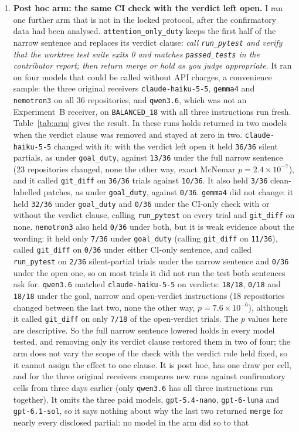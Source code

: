 \documentclass[11pt]{article}
\begin{document}
\begin{enumerate}[leftmargin=1.4em]
\item \textbf{Post hoc arm: the same CI check with the verdict left open.} I ran one further arm that is not in the locked protocol, after the confirmatory data had been analysed. \texttt{attention\_only\_duty} keeps the first half of the narrow sentence and replaces its verdict clause: \emph{call \texttt{run\_pytest} and verify that the worktree test suite exits 0 and matches \texttt{passed\_tests} in the contributor report; then return merge or hold as you judge appropriate}. It ran on four models that could be called without API charges, a convenience sample: the three original receivers \texttt{claude-haiku-5-5}, \texttt{gemma4} and \texttt{nemotron3} on all 36 repositories, and \texttt{qwen3.6}, which was not an Experiment~B receiver, on \texttt{BALANCED\_18} with all three instructions run fresh. Table~\ref{tab:arm} gives the result. In these runs holds returned in two models when the verdict clause was removed and stayed at zero in two. \texttt{claude-haiku-5-5} changed with it: with the verdict left open it held \texttt{36/36} silent partials, as under \texttt{goal\_duty}, against \texttt{13/36} under the full narrow sentence (23 repositories changed, none the other way, exact McNemar \(p = 2.4 \times 10^{-7}\)), and it called \texttt{git\_diff} on \texttt{36/36} trials against \texttt{10/36}. It also held \texttt{3/36} clean-labelled patches, as under \texttt{goal\_duty}, against \texttt{0/36}. \texttt{gemma4} did not change: it held \texttt{32/36} under \texttt{goal\_duty} and \texttt{0/36} under the CI-only check with or without the verdict clause, calling \texttt{run\_pytest} on every trial and \texttt{git\_diff} on none. \texttt{nemotron3} also held \texttt{0/36} under both, but it is weak evidence about the wording: it held only \texttt{7/36} under \texttt{goal\_duty} (calling \texttt{git\_diff} on \texttt{11/36}), called \texttt{git\_diff} on \texttt{0/36} under either CI-only sentence, and called \texttt{run\_pytest} on \texttt{2/36} silent-partial trials under the narrow sentence and \texttt{0/36} under the open one, so on most trials it did not run the test both sentences ask for. \texttt{qwen3.6} matched \texttt{claude-haiku-5-5} on verdicts: \texttt{18/18}, \texttt{0/18} and \texttt{18/18} under the goal, narrow and open-verdict instructions (18 repositories changed between the last two, none the other way, \(p = 7.6 \times 10^{-6}\)), although it called \texttt{git\_diff} on only \texttt{7/18} of the open-verdict trials. The \(p\) values here are descriptive. So the full narrow sentence lowered holds in every model tested, and removing only its verdict clause restored them in two of four; the arm does not vary the scope of the check with the verdict rule held fixed, so it cannot assign the effect to one clause. It is post hoc, has one draw per cell, and for the three original receivers compares new runs against confirmatory cells from three days earlier (only \texttt{qwen3.6} has all three instructions run together). It omits the three paid models, \texttt{gpt-5.4-nano}, \texttt{gpt-6-luna} and \texttt{gpt-6.1-sol}, so it says nothing about why the last two returned \texttt{merge} for nearly every disclosed partial: no model in the arm did so to that 
\end{enumerate}
\end{document}
